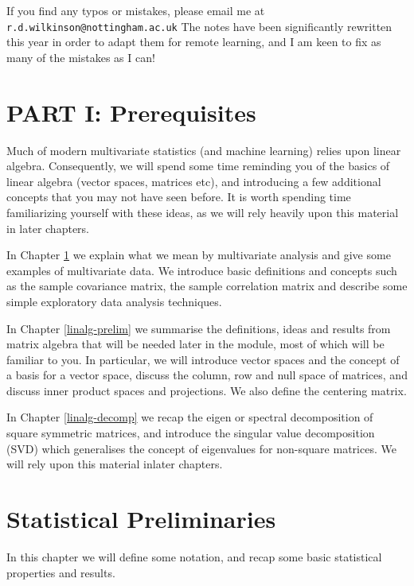 \documentclass[]{book}
\theoremstyle{definition}
\theoremstyle{definition}
\theoremstyle{definition}
\theoremstyle{remark}
\begin{document}
If you find any typos or mistakes, please email me at \texttt{r.d.wilkinson@nottingham.ac.uk} The notes have been significantly rewritten this year in order to adapt them for remote learning, and I am keen to fix as many of the mistakes as I can!

\hypertarget{part-i-prerequisites}{%
\chapter*{PART I: Prerequisites}\label{part-i-prerequisites}}

Much of modern multivariate statistics (and machine learning) relies upon linear algebra. Consequently, we will spend some time reminding you of the basics of linear algebra (vector spaces, matrices etc), and introducing a few additional concepts that you may not have seen before. It is worth spending time familiarizing yourself with these ideas, as we will rely heavily upon this material in later chapters.

In Chapter \ref{stat-prelim} we explain what we mean by multivariate analysis and give some examples of multivariate data. We introduce basic definitions and concepts such as the sample covariance matrix, the sample correlation matrix and describe some simple exploratory data analysis techniques.

In Chapter \ref{linalg-prelim} we summarise the definitions, ideas and results from matrix algebra that will be needed later in the module, most of which will be familiar to you. In particular, we will introduce vector spaces and the concept of a basis for a vector space, discuss the column, row and null space of matrices, and discuss inner product spaces and projections. We also define the centering matrix.

In Chapter \ref{linalg-decomp} we recap the eigen or spectral decomposition of square symmetric matrices, and introduce the singular value decomposition (SVD) which generalises the concept of eigenvalues for non-square matrices. We will rely upon this material inlater chapters.

\hypertarget{stat-prelim}{%
\chapter{Statistical Preliminaries}\label{stat-prelim}}

In this chapter we will define some notation, and recap some basic statistical properties and results.
\end{document}
